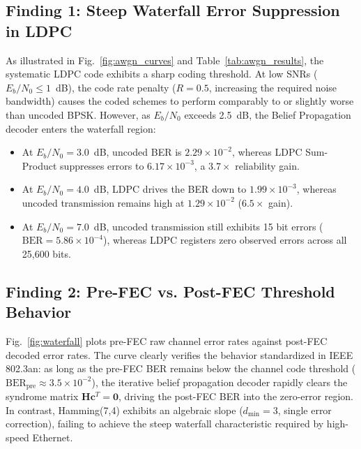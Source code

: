 \documentclass[conference]{IEEEtran}
\begin{document}
\subsection{Finding 1: Steep Waterfall Error Suppression in LDPC}
As illustrated in Fig.~\ref{fig:awgn_curves} and Table~\ref{tab:awgn_results}, the systematic LDPC code exhibits a sharp coding threshold. At low SNRs ($E_b/N_0 \le 1$~dB), the code rate penalty ($R = 0.5$, increasing the required noise bandwidth) causes the coded schemes to perform comparably to or slightly worse than uncoded BPSK. However, as $E_b/N_0$ exceeds 2.5~dB, the Belief Propagation decoder enters the waterfall region:
\begin{itemize}
    \item At $E_b/N_0 = 3.0$~dB, uncoded BER is $2.29 \times 10^{-2}$, whereas LDPC Sum-Product suppresses errors to $6.17 \times 10^{-3}$, a $3.7\times$ reliability gain.
    \item At $E_b/N_0 = 4.0$~dB, LDPC drives the BER down to $1.99 \times 10^{-3}$, whereas uncoded transmission remains high at $1.29 \times 10^{-2}$ ($6.5\times$ gain).
    \item At $E_b/N_0 = 7.0$~dB, uncoded transmission still exhibits 15 bit errors ($\text{BER} = 5.86 \times 10^{-4}$), whereas LDPC registers zero observed errors across all 25,600 bits.
\end{itemize}

\subsection{Finding 2: Pre-FEC vs. Post-FEC Threshold Behavior}
Fig.~\ref{fig:waterfall} plots pre-FEC raw channel error rates against post-FEC decoded error rates. The curve clearly verifies the behavior standardized in IEEE 802.3an: as long as the pre-FEC BER remains below the channel code threshold ($\text{BER}_{\text{pre}} \approx 3.5 \times 10^{-2}$), the iterative belief propagation decoder rapidly clears the syndrome matrix $\mathbf{H}\mathbf{c}^T = \mathbf{0}$, driving the post-FEC BER into the zero-error region. In contrast, Hamming(7,4) exhibits an algebraic slope ($d_{\min} = 3$, single error correction), failing to achieve the steep waterfall characteristic required by high-speed Ethernet.
\end{document}
